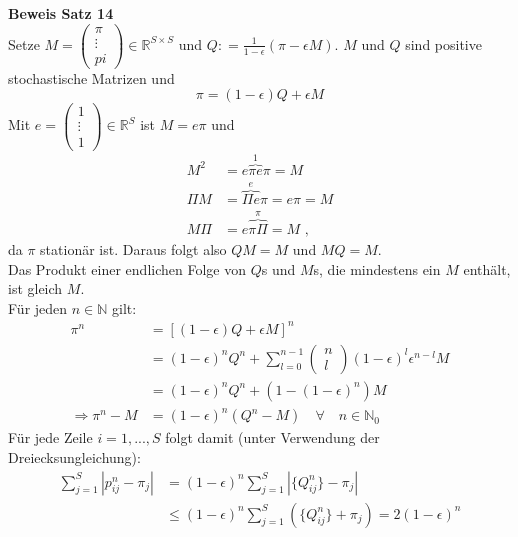 \documentclass[a4paper,12pt]{article}
\begin{document}
\textbf{Beweis Satz 14}\\
Setze $M = \begin{pmatrix} \pi \\ \vdots \\pi \end{pmatrix} \in \mathbb{R}^{S \times S}$ und $Q: = \frac{1}{1-\epsilon}(\pi - \epsilon M)$.
$M$ und $Q$ sind positive stochastische Matrizen und
$$
	\pi = (1-\epsilon)Q + \epsilon M
$$
Mit $e = \begin{pmatrix} 1 \\ \vdots \\ 1 \end{pmatrix} \in \mathbb{R}^S$ ist $M = e \pi$ und
\begin{align*}
	M^2   & = e   \overbrace{\pi e}^{1} \pi = M         \\
	\Pi M & = \overbrace{\Pi e}^{e} \pi = e \pi = M     \\
	M \Pi & = e \overbrace{\pi \Pi}^{\pi} = M \text{ ,}
\end{align*}
da $\pi$ stationär ist.
Daraus folgt also $QM = M$ und $MQ = M$.\\
Das Produkt einer endlichen Folge von $Q$s und $M$s, die mindestens ein $M$ enthält, ist gleich $M$.\\
Für jeden $n \in \mathbb{N}$ gilt:
\begin{align*}
	\pi^n                 & = \left[(1-\epsilon)Q + \epsilon M\right]^n                                                            \\
	                      & = (1-\epsilon)^nQ^n + \sum_{l=0}^{n-1}\begin{pmatrix}n \\ l \end{pmatrix}(1-\epsilon)^l\epsilon^{n-l}M \\
	                      & = (1-\epsilon)^nQ^n + (1-(1-\epsilon)^n)M                                                              \\
	\Rightarrow \pi^n - M & = (1-\epsilon)^n(Q^n - M) \quad \forall \quad n \in \mathbb{N}_0
\end{align*}
Für jede Zeile $i=1, ..., S$ folgt damit (unter Verwendung der Dreiecksungleichung):
\begin{align*}
	\sum_{j=1}^{S}|p_{ij}^n - \pi_j| & = (1-\epsilon)^n \sum_{j=1}^{S}|\{Q_{ij}^n\} - \pi_j   |                              \\
	                                 & \leq (1-\epsilon)^n\sum_{j=1}^{S}\left(\{Q_{ij}^n\} + \pi_j\right) = 2(1- \epsilon)^n
\end{align*}
\end{document}
